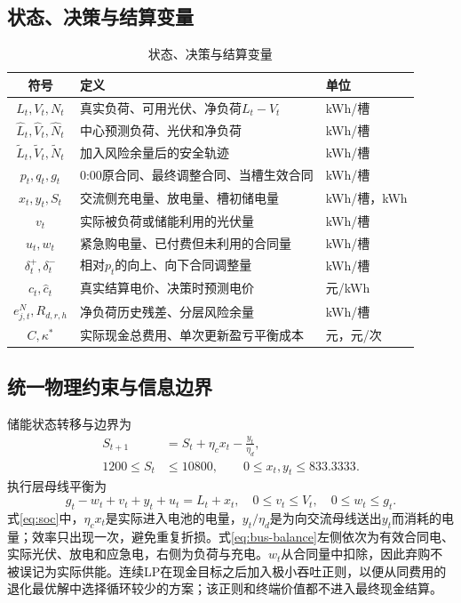 \documentclass[UTF8,12pt,a4paper]{ctexart}
\theoremstyle{remark}
\begin{document}
\subsection{状态、决策与结算变量}
\begin{table}[H]\centering\small\caption{状态、决策与结算变量}\label{tab:variables}
\begin{tabular}{cll}\toprule 符号&定义&单位\\\midrule
$L_t,V_t,N_t$&真实负荷、可用光伏、净负荷$L_t-V_t$&kWh/槽\\
$\widehat L_t,\widehat V_t,\widehat N_t$&中心预测负荷、光伏和净负荷&kWh/槽\\
$\widetilde L_t,\widetilde V_t,\widetilde N_t$&加入风险余量后的安全轨迹&kWh/槽\\
$p_t,q_t,g_t$&0:00原合同、最终调整合同、当槽生效合同&kWh/槽\\
$x_t,y_t,S_t$&交流侧充电量、放电量、槽初储电量&kWh/槽，kWh\\
$v_t$&实际被负荷或储能利用的光伏量&kWh/槽\\
$u_t,w_t$&紧急购电量、已付费但未利用的合同量&kWh/槽\\
$\delta_t^+,\delta_t^-$&相对$p_t$的向上、向下合同调整量&kWh/槽\\
$c_t,\widehat c_t$&真实结算电价、决策时预测电价&元/kWh\\
$e^N_{j,t},R_{d,r,h}$&净负荷历史残差、分层风险余量&kWh/槽\\
$C,\kappa^*$&实际现金总费用、单次更新盈亏平衡成本&元，元/次\\\bottomrule
\end{tabular}\end{table}

\subsection{统一物理约束与信息边界}
储能状态转移与边界为
\begin{align}
S_{t+1}&=S_t+\eta_cx_t-\frac{y_t}{\eta_d},\label{eq:soc}\\
1200\le S_t&\le10800,\qquad0\le x_t,y_t\le833.3333.\label{eq:battery-bound}
\end{align}
执行层母线平衡为
\begin{equation}g_t-w_t+v_t+y_t+u_t=L_t+x_t,\quad0\le v_t\le V_t,\quad0\le w_t\le g_t.\label{eq:bus-balance}\end{equation}
式\eqref{eq:soc}中，$\eta_cx_t$是实际进入电池的电量，$y_t/\eta_d$是为向交流母线送出$y_t$而消耗的电量；效率只出现一次，避免重复折损。式\eqref{eq:bus-balance}左侧依次为有效合同电、实际光伏、放电和应急电，右侧为负荷与充电。$w_t$从合同量中扣除，因此弃购不被误记为实际供能。连续LP在现金目标之后加入极小吞吐正则，以便从同费用的退化最优解中选择循环较少的方案；该正则和终端价值都不进入最终现金结算。
\end{document}
